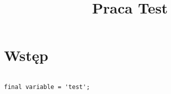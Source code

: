 \documentclass[12pt,a4paper]{article}
\title{Praca Test}
\begin{document}
\section{Wstęp}

\begin{verbatim}

final variable = 'test';

\end{verbatim}
\end{document}
